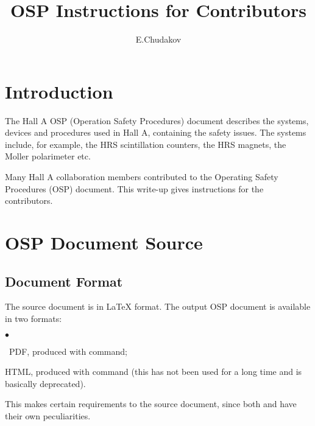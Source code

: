 \documentclass[12pt,letterpaper]{article}
\begin{document}
\color{\Mcol}
\pagestyle{headings}

\begin{titlepage}
\title{{\bf OSP Instructions for Contributors}}

\author{E.Chudakov} 
\setcounter{tocdepth}{3}
\end{titlepage} 
\maketitle 
 
\tableofcontents



\section{Introduction}
\label{sec:intro}

  The Hall A\cite{Hallawww} OSP (Operation Safety Procedures) document describes  
  the systems, devices and procedures used in Hall A, containing
  the safety issues. The systems include, for example, the HRS
  scintillation counters, the HRS magnets, the Moller polarimeter
  etc. 

  Many Hall A collaboration members contributed to the Operating Safety 
  Procedures (OSP) document. This write-up gives instructions for the
  contributors\cite{OSPgen}.

\section{OSP Document Source}
\label{sec:document}
   
\subsection{Document Format}
\label{sec:format}   

  The source document is in \LaTeX{} format.
  The output OSP document is available in two formats: 
  \begin{list}{$\bullet$}{\setlength{\itemsep}{-0.15cm}}
    \item ~PDF, produced with  command; 
    \item HTML, produced with  command (this has not been used for a long
          time and is basically deprecated). 
  \end{list}
  This makes certain requirements to the source document,
  since both  and  have their own
  peculiarities.
\end{document}
